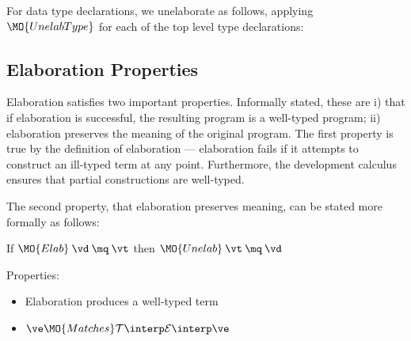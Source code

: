 \noindent
For data type declarations, we unelaborate as follows, applying $\MO{UnelabType}$
for each of the top level type declarations:



\subsection{Elaboration Properties}

Elaboration satisfies two important properties. Informally stated, these are
i) that if elaboration is successful, the
resulting program is a well-typed \TT{} program; ii) elaboration preserves the
meaning of the original \Idris{} program. The first property is true by the
definition of elaboration --- elaboration fails if it attempts to construct an ill-typed
term at any point. Furthermore, the development calculus \TTdev{} ensures that 
partial constructions are well-typed.

The second property, that elaboration preserves meaning, can be stated more formally
as follows: 

If $\MO{Elab}\:\vd\:\mq\:\vt$ then $\MO{Unelab}\:\vt\:\mq\:\vd$

Properties:
\begin{itemize}
\item Elaboration produces a well-typed term
\item $\ve \MO{Matches} \uninterp{\ttinterp{\ve}}$
\end{itemize}


